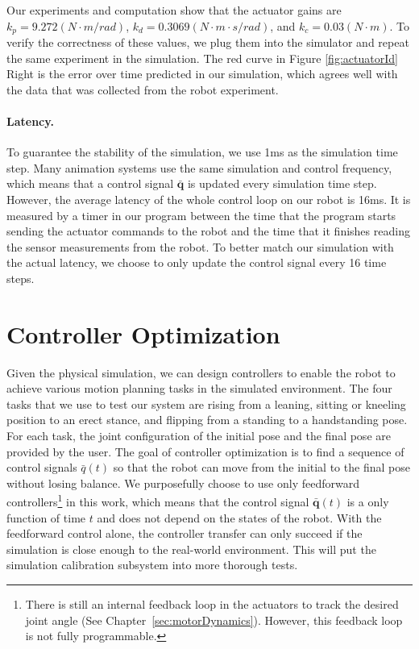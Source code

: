 Our experiments and computation show that the actuator gains are $k_p=9.272(N\cdot m/rad)$, $k_d=0.3069(N\cdot m\cdot s/rad)$, and $k_c=0.03(N\cdot m)$. To verify the correctness of these values, we plug them into the simulator and repeat the same experiment in the simulation. The red curve in Figure \ref{fig:actuatorId} Right is the error over time predicted in our simulation, which agrees well with the data that was collected from the robot experiment.

\paragraph{Latency.} To guarantee the stability of the simulation, we use 1ms as the simulation time step. Many animation systems use the same simulation and control frequency, which means that a control signal $\bar{\mathbf{q}}$ is updated every simulation time step. However, the average latency of the whole control loop on our robot is 16ms. It is measured by a timer in our program between the time that the program starts sending the actuator commands to the robot and the time that it finishes reading the sensor measurements from the robot. To better match our simulation with the actual latency, we choose to only update the control signal every 16 time steps.

\section{Controller Optimization}

Given the physical simulation, we can design controllers to enable the robot to achieve various motion planning tasks in the simulated environment. The four tasks that we use to test our system are rising from a leaning, sitting or kneeling position to an erect stance, and flipping from a standing to a handstanding pose. For each task, the joint configuration of the initial pose and the final pose are provided by the user. The goal of controller optimization is to find a sequence of control signals $\bar{q}(t)$ so that the robot can move from the initial to the final pose without losing balance. We purposefully choose to use only feedforward controllers\footnote{There is still an internal feedback loop in the actuators to track the desired joint angle (See Chapter~\ref{sec:motorDynamics}). However, this feedback loop is not fully programmable.} in this work, which means that the control signal $\bar{\mathbf{q}}(t)$ is a only function of time $t$ and does not depend on the states of the robot. With the feedforward control alone, the controller transfer can only succeed if the simulation is close enough to the real-world environment. This will put the simulation calibration subsystem into more thorough tests.

